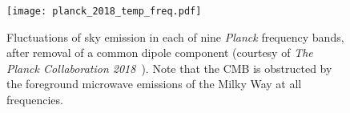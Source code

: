 \begin{figure}[htpb]
	\centering\capstart{}
	\texttt{[image: planck\_2018\_temp\_freq.pdf]}
	\caption[
		The 2018 \emph{Planck} maps in intensity in each frequency band
	]{
		Fluctuations of sky emission in each of nine \emph{Planck} frequency bands, after removal of a common dipole component (courtesy of \emph{The Planck Collaboration 2018}~\cite{Planck2020}).
		Note that the CMB is obstructed by the foreground microwave emissions of the Milky Way at all frequencies.
	}\label{fig:chapter2_planck_frequency}
\end{figure}
